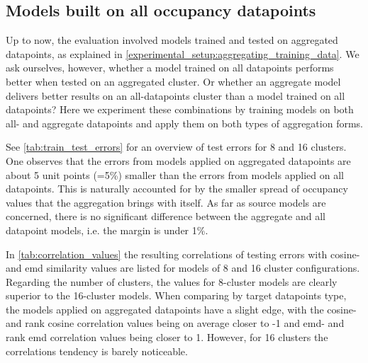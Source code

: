 

\subsection{Models built on all occupancy datapoints}
\label{evaluation:entire_datapoints}
Up to now, the evaluation involved models trained and tested on aggregated datapoints, as explained in \cref{experimental_setup:aggregating_training_data}. We ask ourselves, however, whether a model trained on all datapoints performs better when tested on an aggregated cluster. Or whether an aggregate model delivers better results on an all-datapoints cluster than a model trained on all datapoints? Here we experiment these combinations by training models on both all- and aggregate datapoints and apply them on both types of aggregation forms. 

See \cref{tab:train_test_errors} for an overview of test errors for 8 and 16 clusters. One observes that the errors from models applied on aggregated datapoints are about 5 unit points (=5\%) smaller than the errors from models applied on all datapoints. This is naturally accounted for by the smaller spread of occupancy values that the aggregation brings with itself. As far as source models are concerned, there is no significant difference between the aggregate and all datapoint models, i.e. the margin is under 1\%.

In \cref{tab:correlation_values} the resulting correlations of testing errors with cosine- and emd similarity values are listed for models of 8 and 16 cluster configurations. Regarding the number of clusters, the values for 8-cluster models are clearly superior to the 16-cluster models. When comparing by target datapoints type, the models applied on aggregated datapoints have a slight edge, with the cosine- and rank cosine correlation values being on average closer to -1 and emd- and rank emd correlation values being closer to 1. However, for 16 clusters the correlations tendency is barely noticeable.
	
